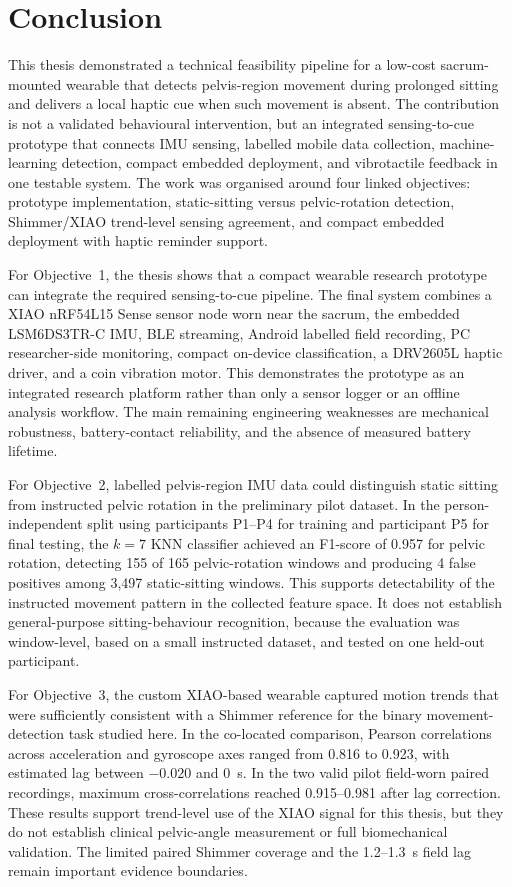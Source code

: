 \chapter{Conclusion}\label{ch:conclusion}

This thesis demonstrated a technical feasibility pipeline for a low-cost sacrum-mounted wearable that detects pelvis-region movement during prolonged sitting and delivers a local haptic cue when such movement is absent. The contribution is not a validated behavioural intervention, but an integrated sensing-to-cue prototype that connects IMU sensing, labelled mobile data collection, machine-learning detection, compact embedded deployment, and vibrotactile feedback in one testable system. The work was organised around four linked objectives: prototype implementation, static-sitting versus pelvic-rotation detection, Shimmer/XIAO trend-level sensing agreement, and compact embedded deployment with haptic reminder support.

For Objective~1, the thesis shows that a compact wearable research prototype can integrate the required sensing-to-cue pipeline. The final system combines a XIAO nRF54L15 Sense sensor node worn near the sacrum, the embedded LSM6DS3TR-C IMU, BLE streaming, Android labelled field recording, PC researcher-side monitoring, compact on-device classification, a DRV2605L haptic driver, and a coin vibration motor. This demonstrates the prototype as an integrated research platform rather than only a sensor logger or an offline analysis workflow. The main remaining engineering weaknesses are mechanical robustness, battery-contact reliability, and the absence of measured battery lifetime.

For Objective~2, labelled pelvis-region IMU data could distinguish static sitting from instructed pelvic rotation in the preliminary pilot dataset. In the person-independent split using participants P1--P4 for training and participant P5 for final testing, the \(k=7\) KNN classifier achieved an F1-score of 0.957 for pelvic rotation, detecting 155 of 165 pelvic-rotation windows and producing 4 false positives among 3{,}497 static-sitting windows. This supports detectability of the instructed movement pattern in the collected feature space. It does not establish general-purpose sitting-behaviour recognition, because the evaluation was window-level, based on a small instructed dataset, and tested on one held-out participant.

For Objective~3, the custom XIAO-based wearable captured motion trends that were sufficiently consistent with a Shimmer reference for the binary movement-detection task studied here. In the co-located comparison, Pearson correlations across acceleration and gyroscope axes ranged from 0.816 to 0.923, with estimated lag between \(-0.020\) and 0~s. In the two valid pilot field-worn paired recordings, maximum cross-correlations reached 0.915--0.981 after lag correction. These results support trend-level use of the XIAO signal for this thesis, but they do not establish clinical pelvic-angle measurement or full biomechanical validation. The limited paired Shimmer coverage and the 1.2--1.3~s field lag remain important evidence boundaries.

